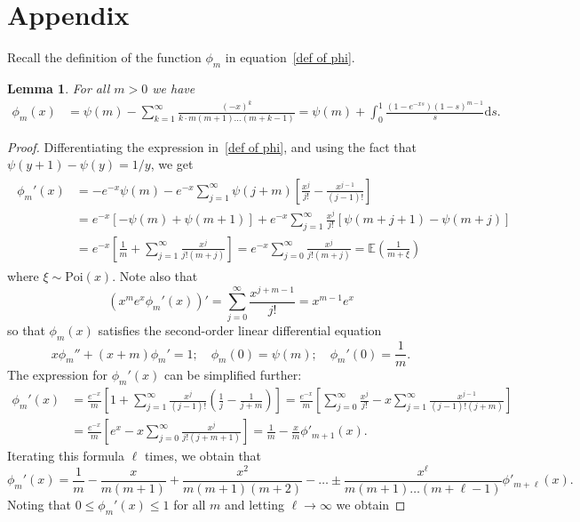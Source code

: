 \documentclass[12pt]{article}
\newtheorem{lemma}{Lemma}
\newcommand{\1}{\mathbf{1}}
\begin{document}
\section{Appendix}
Recall the definition of the function $\phi_m$ in equation~\eqref{def of phi}.
\begin{lemma}\label{lem:phi}
For all $m>0$ we have
\begin{align*}
\phi_m(x) &=\psi(m)
-\sum_{k=1}^\infty \frac{(-x)^k}{k\cdot m(m+1)\dots(m+k-1)}
=
\psi(m)+\int_0^1 \frac{(1-e^{-xs})(1-s)^{m-1}}{s}\mathrm{d}s.
\end{align*}
\end{lemma}
\begin{proof}
Differentiating the expression in~\eqref{def of phi}, and using the fact that $\psi(y+1)-\psi(y)=1/y$, we get
\begin{align}\label{eq:phiprime}
\begin{split}
\phi_m'(x)&=-e^{-x}\psi(m)-
e^{-x}\sum_{j=1}^\infty\psi(j+m)\left[\frac{x^j}{j!}-\frac{x^{j-1}}{(j-1)!}\right]
\\ &=
e^{-x}\left[ -\psi(m)+\psi(m+1)\right]
+e^{-x}\sum_{j=1}^\infty\frac{x^j}{j!}\left[\psi(m+j+1)-\psi(m+j)\right]
\\ &
=e^{-x}\left[\frac1m
+\sum_{j=1}^\infty\frac{x^j}{j!(m+j)}
\right]
=e^{-x}\sum_{j=0}^\infty\frac{x^j}{j!(m+j)}
=\mathbb{E}\left(\frac1{m+\xi}\right)
\end{split}\end{align}
where $\xi \sim \mathrm{Poi}(x)$. Note also that
$$
\left(x^m e^x \phi_m'(x)\right)'=\sum_{j=0}^\infty \frac{x^{j+m-1}}{j!}=x^{m-1} e^x
$$
so that $\phi_m(x)$ satisfies the second-order linear differential equation
$$
x \phi_m''+(x+m)\phi_m'=1;\quad\phi_m(0)=\psi(m); \quad \phi_m'(0)=\frac1m.
$$
The expression for $\phi_m'(x)$ can be simplified
further:
\begin{align*}
\phi_m'(x)&=\frac{e^{-x}}m\left[1
+\sum_{j=1}^\infty\frac{x^j}{(j-1)!} \left(\frac1j-\frac1{j+m}\right)
\right]=
\frac{e^{-x}}m\left[\sum_{j=0}^\infty\frac{x^j}{j!} 
-x\sum_{j=1}^\infty\frac{x^{j-1}}{(j-1)!(j+m)} 
\right]
\\ &=
\frac{e^{-x}}m\left[e^x
-x\sum_{j=0}^\infty\frac{x^{j}}{j!(j+m+1)} 
\right]
=\frac1m -\frac{x}m\phi'_{m+1}(x).
\end{align*}
Iterating this formula $\ell$ times, we obtain that
$$
\phi_m'(x)=\frac1m-\frac{x}{m(m+1)}
+\frac{x^2}{m(m+1)(m+2)}-\dots  \pm \frac{x^\ell}{m(m+1)\dots(m+\ell-1)}\phi'_{m+\ell}(x).
$$
Noting that $0\le \phi_m'(x)\le 1$ for all $m$ and letting $\ell\to\infty$ we obtain 

\end{proof}
\end{document}
